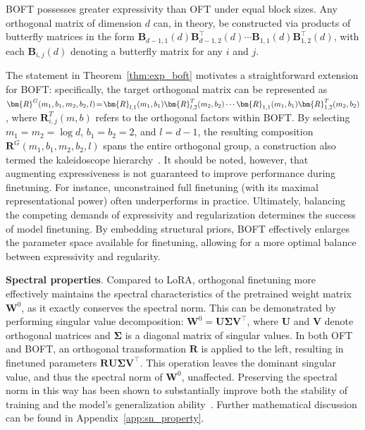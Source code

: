 \begin{theorem}\label{thm:exp_boft}
    BOFT possesses greater expressivity than OFT under equal block sizes. Any orthogonal matrix of dimension $d$ can, in theory, be constructed via products of butterfly matrices in the form $\bm{B}_{d-1,1}(d)\bm{B}^\top_{d-1,2}(d)\cdots\bm{B}_{1,1}(d)\bm{B}^\top_{1,2}(d)$, with each $\bm{B}_{i,j}(d)$ denoting a butterfly matrix for any $i$ and $j$.
\end{theorem}

The statement in Theorem~\ref{thm:exp_boft} motivates a straightforward extension for BOFT: specifically, the target orthogonal matrix can be represented as $\thickmuskip=2mu \medmuskip=2mu \bm{R}^G(m_1,b_1,m_2,b_2,l)=\bm{R}_{l,1}(m_1,b_1)\bm{R}_{l,2}^T(m_2,b_2)\cdots\bm{R}_{1,1}(m_1,b_1)\bm{R}_{1,2}^T(m_2,b_2)$, where $\bm{R}_{i,j}^T(m,b)$ refers to the orthogonal factors within BOFT. By selecting $m_1=m_2=\log d$, $b_1=b_2=2$, and $l=d-1$, the resulting composition $\bm{R}^G(m_1,b_1,m_2,b_2,l)$ spans the entire orthogonal group, a construction also termed the kaleidoscope hierarchy~\cite{dao2019kaleidoscope}. It should be noted, however, that augmenting expressiveness is not guaranteed to improve performance during finetuning. For instance, unconstrained full finetuning (with its maximal representational power) often underperforms in practice. Ultimately, balancing the competing demands of expressivity and regularization determines the success of model finetuning. By embedding structural priors, BOFT effectively enlarges the parameter space available for finetuning, allowing for a more optimal balance between expressivity and regularity.

\textbf{Spectral properties}. Compared to LoRA, orthogonal finetuning more effectively maintains the spectral characteristics of the pretrained weight matrix $\bm{W}^0$, as it exactly conserves the spectral norm. This can be demonstrated by performing singular value decomposition: $\bm{W}^0=\bm{U}\bm{\Sigma}\bm{V}^\top$, where $\bm{U}$ and $\bm{V}$ denote orthogonal matrices and $\bm{\Sigma}$ is a diagonal matrix of singular values. In both OFT and BOFT, an orthogonal transformation $\bm{R}$ is applied to the left, resulting in finetuned parameters $\bm{R}\bm{U}\bm{\Sigma}\bm{V}^\top$. This operation leaves the dominant singular value, and thus the spectral norm of $\bm{W}^0$, unaffected. Preserving the spectral norm in this way has been shown to substantially improve both the stability of training and the model's generalization ability~\cite{miyato2018spectral,yoshida2017spectral}. Further mathematical discussion can be found in Appendix~\ref{app:sn_property}.

